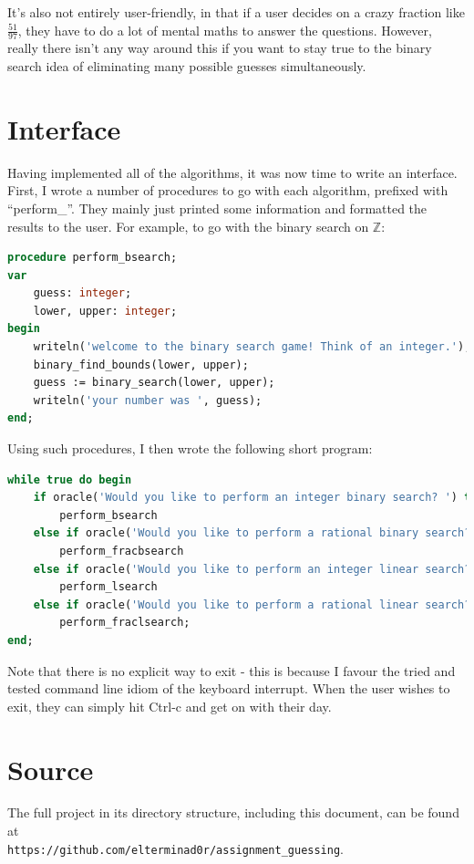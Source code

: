 \documentclass{article}
\begin{document}
    It's also not entirely user-friendly, in that if a user decides on a crazy
    fraction like $\frac{51}{97}$, they have to do a lot of mental maths to
    answer the questions. However, really there isn't any way around this if
    you want to stay true to the binary search idea of eliminating many
    possible guesses simultaneously.

    \section{Interface}
    Having implemented all of the algorithms, it was now time to write an
    interface. First, I wrote a number of procedures to go with each algorithm,
    prefixed with ``perform\_''. They mainly just printed some information and
    formatted the results to the user. For example, to go with the binary
    search on $\mathbb{Z}$:

\begin{lstlisting}[language=Pascal, caption=Binary search on $\mathbb{Z}$ wrapper procedure]
procedure perform_bsearch;
var
    guess: integer;
    lower, upper: integer;
begin
    writeln('welcome to the binary search game! Think of an integer.');
    binary_find_bounds(lower, upper);
    guess := binary_search(lower, upper);
    writeln('your number was ', guess);
end;
\end{lstlisting}

    Using such procedures, I then wrote the following short program:

\begin{lstlisting}[language=Pascal, caption=Main interface loop]
while true do begin
    if oracle('Would you like to perform an integer binary search? ') then
        perform_bsearch
    else if oracle('Would you like to perform a rational binary search? ') then
        perform_fracbsearch
    else if oracle('Would you like to perform an integer linear search? ') then
        perform_lsearch
    else if oracle('Would you like to perform a rational linear search? ') then
        perform_fraclsearch;
end;
\end{lstlisting} 

    Note that there is no explicit way to exit - this is because I favour the
    tried and tested command line idiom of the keyboard interrupt. When the
    user wishes to exit, they can simply hit Ctrl-c and get on with their day.

    \section{Source}
    The full project in its directory structure, including this document, can
    be found at\\ \verb|https://github.com/elterminad0r/assignment_guessing|.
\end{document}
